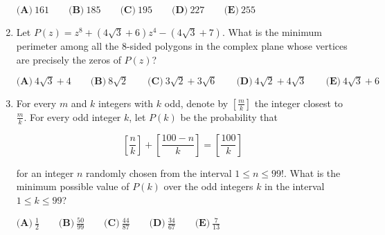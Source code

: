 \documentclass{article}
\begin{document}
\begin{enumerate}[label=\arabic*., itemsep=0.5em]
\(\textbf{(A)}\ 161 \qquad \textbf{(B)}\ 185 \qquad \textbf{(C)}\  195 \qquad \textbf{(D)}\  227 \qquad \textbf{(E)}\  255\)\par \vspace{0.5em}\item Let \(P(z) = z^8 + \left(4\sqrt{3} + 6\right)z^4 - \left(4\sqrt{3} + 7\right)\). What is the minimum perimeter among all the \(8\)-sided polygons in the complex plane whose vertices are precisely the zeros of \(P(z)\)?

\(\textbf{(A)}\ 4\sqrt{3} + 4 \qquad \textbf{(B)}\ 8\sqrt{2} \qquad \textbf{(C)}\  3\sqrt{2} + 3\sqrt{6} \qquad \textbf{(D)}\  4\sqrt{2} + 4\sqrt{3} \qquad \textbf{(E)}\  4\sqrt{3} + 6\)\par \vspace{0.5em}\item For every \(m\) and \(k\) integers with \(k\) odd, denote by \(\left[\frac{m}{k}\right]\) the integer closest to \(\frac{m}{k}\). For every odd integer \(k\), let \(P(k)\) be the probability that


\begin{equation*}
\left[\frac{n}{k}\right] + \left[\frac{100 - n}{k}\right] = \left[\frac{100}{k}\right]
\end{equation*}


for an integer \(n\) randomly chosen from the interval \(1 \leq n \leq 99!\). What is the minimum possible value of \(P(k)\) over the odd integers \(k\) in the interval \(1 \leq k \leq 99\)?

\(\textbf{(A)}\ \frac{1}{2} \qquad \textbf{(B)}\ \frac{50}{99} \qquad \textbf{(C)}\ \frac{44}{87} \qquad \textbf{(D)}\  \frac{34}{67} \qquad \textbf{(E)}\  \frac{7}{13}\)\par \vspace{0.5em}
\end{enumerate}
\end{document}

